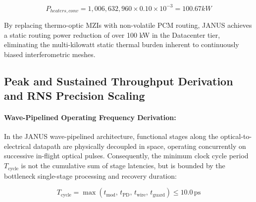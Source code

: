 \documentclass[journal]{IEEEtran}
\begin{document}
\begin{equation}
P_{heaters,conv} = 1,006,632,960 \times 0.10 \times 10^{-3} = 100.67 kW
\end{equation}

By replacing thermo-optic MZIs with non-volatile PCM routing, JANUS achieves a static routing power reduction of over 100 kW in the Datacenter tier, eliminating the multi-kilowatt static thermal burden inherent to continuously biased interferometric meshes.

\subsection{\textbf{Peak and Sustained Throughput Derivation and RNS Precision Scaling}}
\label{sec:operating_frequency}

\paragraph{\textbf{Wave-Pipelined Operating Frequency Derivation:}}

In the JANUS wave-pipelined architecture, functional stages along the optical-to-electrical datapath are physically decoupled in space, operating concurrently on successive in-flight optical pulses. Consequently, the minimum clock cycle period $T_{\text{cycle}}$ is not the cumulative sum of stage latencies, but is bounded by the bottleneck single-stage processing and recovery duration:

\begin{equation}
T_{\text{cycle}} = \max\left( t_{\text{mod}}, \, t_{\text{PD}}, \, t_{\text{wire}}, \, t_{\text{guard}} \right) \le 10.0\,\text{ps}
\end{equation}
\end{document}
